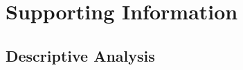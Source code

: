 \documentclass[12pt, letterpaper]{article}
\begin{document}
\clearpage


\clearpage

\appendix
\renewcommand{\thesection}{SI \arabic{section}}
\renewcommand\thetable{\thesection.\arabic{table}}  
\renewcommand\thefigure{\thesection.\arabic{figure}}

\section{Supporting Information}\label{si}

\FloatBarrier
\subsection{Descriptive Analysis}
\end{document}
